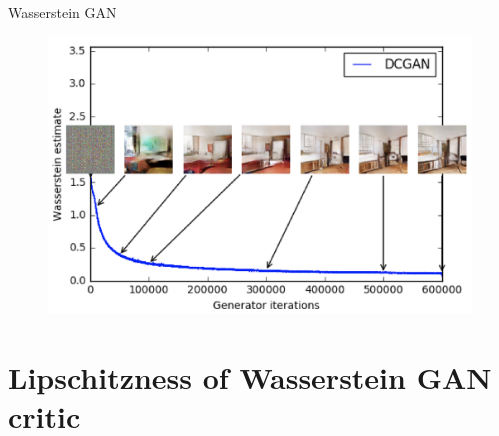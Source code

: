 \begin{frame}{Wasserstein GAN}
\begin{minipage}[t]{0.5\columnwidth}
\begin{figure}
		\end{figure}
	\end{minipage}%
	\begin{minipage}[t]{0.5\columnwidth}
		\begin{figure}
			\centering
			\includegraphics[width=1.0\linewidth]{figs/wgan_quality}
		\end{figure}
	\end{minipage}
	
\end{frame}
\section{Lipschitzness of Wasserstein GAN critic}
